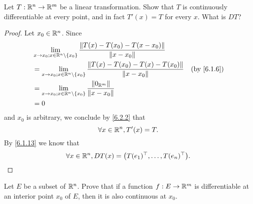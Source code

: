 \exercisesection

\begin{ex}\label{ex:6.4.1}
  Let \(T : \mathbb{R}^n \to \mathbb{R}^m\) be a linear transformation.
  Show that \(T\) is continuously differentiable at every point, and in fact \(T'(x) = T\) for every \(x\).
  What is \(D T\)?
\end{ex}

\begin{proof}
  Let \(x_0 \in \mathbb{R}^n\).
  Since
  \begin{align*}
     & \lim_{x \to x_0 ; x \in \R^n \setminus \{x_0\}} \frac{\norm*{T(x) - T(x_0) - T(x - x_0)}}{\norm*{x - x_0}}                                 \\
     & = \lim_{x \to x_0 ; x \in \R^n \setminus \{x_0\}} \frac{\norm*{T(x) - T(x_0) - T(x) - T(x_0)}}{\norm*{x - x_0}} & \text{(by \cref{6.1.6})} \\
     & = \lim_{x \to x_0 ; x \in \R^n \setminus \{x_0\}} \frac{\norm*{0_{\R^m}}}{\norm*{x - x_0}}                                                 \\
     & = 0
  \end{align*}
  and \(x_0\) is arbitrary, we conclude by \cref{6.2.2} that
  \[
    \forall x \in \mathbb{R}^n, T'(x) = T.
  \]
  By \cref{6.1.13} we know that
  \[
    \forall x \in \mathbb{R}^n, D T(x) = \big(T(e_1)^\top, \dots, T(e_n)^\top\big).
  \]
\end{proof}

\begin{ex}\label{ex:6.4.2}
  Let \(E\) be a subset of \(\mathbb{R}^n\).
  Prove that if a function \(f : E \to \mathbb{R}^m\) is differentiable at an interior point \(x_0\) of \(E\), then it is also continuous at \(x_0\).
\end{ex}

